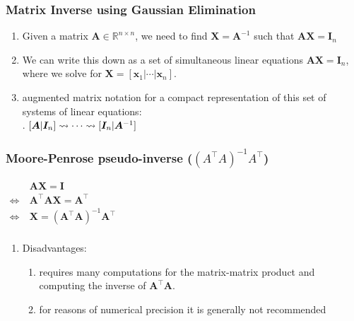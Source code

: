 \subsubsection{Matrix Inverse using Gaussian Elimination}

\begin{enumerate}
    \item Given a matrix $\bm{A} \in \mathbb{R}^{n\times n}$, we need to find $\bm{X} = \bm{A}^{-1}$ such that $\bm{A}\bm{X} = \bm{I}_n$
    \hfill \cite{mfml/book/mml/Deisenroth-Faisal-Ong}
    
    \item We can write this down as a set of simultaneous linear equations $\bm{A}\bm{X} = \bm{I}_n$, where we solve for $\bm{X} = [\bm{x}_1| \cdots |\bm{x}_n]$. 
    \hfill \cite{mfml/book/mml/Deisenroth-Faisal-Ong}

    \item augmented matrix notation for a compact representation of this set of systems of linear equations:
    \hfill \cite{mfml/book/mml/Deisenroth-Faisal-Ong}
    \\
    .\hfill
    $
        [\bm{A}|\bm{I}_n] 
        \mathrel{\leadsto} \cdots \mathrel{\leadsto} 
        [\bm{I}_n|\bm{A}^{-1}]
    $
    \hfill \cite{mfml/book/mml/Deisenroth-Faisal-Ong}

    
\end{enumerate}




\subsubsection{Moore-Penrose pseudo-inverse ($({A}^\top {A})^{-1} {A}^\top$)}

$
    \begin{aligned}
                         & \bm{A}\bm{X} = \bm{I} \\
        \Leftrightarrow\ & \bm{A}^\top \bm{A}\bm{X} = \bm{A}^\top \\
        \Leftrightarrow\ & \bm{X} = (\bm{A}^\top \bm{A})^{-1} \bm{A}^\top \\
    \end{aligned}
$
\hfill \cite{mfml/book/mml/Deisenroth-Faisal-Ong}


\vspace{0.2cm}

\begin{enumerate}
    \item Disadvantages:
    \begin{enumerate}
        \item requires many computations for the matrix-matrix product and computing the inverse of $\bm{A}^\top \bm{A}$. 
        \hfill \cite{mfml/book/mml/Deisenroth-Faisal-Ong}

        \item for reasons of numerical precision it is generally not recommended
        \hfill \cite{mfml/book/mml/Deisenroth-Faisal-Ong}
    \end{enumerate}
\end{enumerate}






